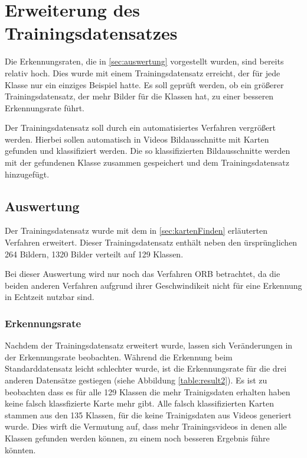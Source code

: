 \section{Erweiterung des Trainingsdatensatzes}\raggedbottom 

Die Erkennungsraten, die in \ref{sec:auswertung} vorgestellt wurden, sind bereits relativ hoch. Dies wurde mit einem Trainingsdatensatz erreicht, der für jede Klasse nur ein einziges Beispiel hatte. Es soll geprüft werden, ob ein größerer Trainingsdatensatz, der mehr Bilder für die Klassen hat, zu einer besseren Erkennungsrate führt. 

Der Trainingsdatensatz soll durch ein automatisiertes Verfahren vergrößert werden. Hierbei sollen automatisch in Videos Bildausschnitte mit Karten gefunden und klassifiziert werden. Die so klassifizierten Bildausschnitte werden mit der gefundenen Klasse zusammen gespeichert und dem Trainingsdatensatz hinzugefügt.





\subsection{Auswertung}

Der Trainingsdatensatz wurde mit dem in \ref{sec:kartenFinden} erläuterten Verfahren erweitert. Dieser Trainingsdatensatz enthält neben den ürsprünglichen 264 Bildern, 1320 Bilder verteilt auf 129 Klassen.

Bei dieser Auswertung wird nur noch das Verfahren ORB betrachtet, da die beiden anderen Verfahren aufgrund ihrer Geschwindikeit nicht für eine Erkennung in Echtzeit nutzbar sind.

\subsubsection{Erkennungsrate}

Nachdem der Trainingsdatensatz erweitert wurde, lassen sich Veränderungen in der Erkennungsrate beobachten.
Während die Erkennung beim Standarddatensatz leicht schlechter wurde, ist die Erkennungsrate für die drei anderen Datensätze gestiegen (siehe Abbildung \ref{table:result2}).
Es ist zu beobachten dass es für alle 129 Klassen die mehr Trainigsdaten erhalten haben keine falsch klassfizierte Karte mehr gibt. Alle falsch klassifizierten Karten stammen aus den 135 Klassen, für die keine Trainigsdaten aus Videos generiert wurde.
Dies wirft die Vermutung auf, dass mehr Trainingsvideos in denen alle Klassen gefunden werden können, zu einem noch besseren Ergebnis führe könnten.

